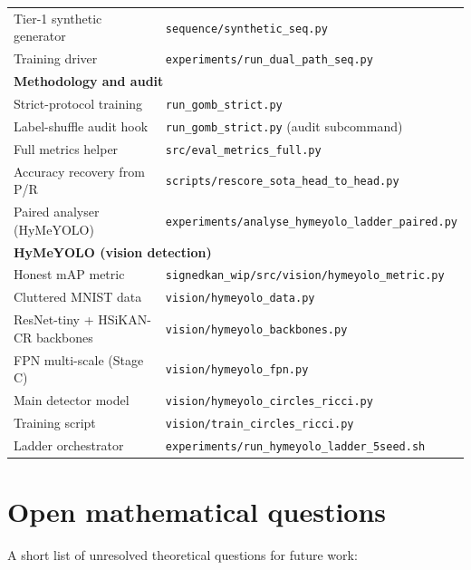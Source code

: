 \documentclass[11pt,a4paper]{article}
\theoremstyle{remark}
\begin{document}
\begin{center}
\begin{tabular}{p{6cm}p{8cm}}
Tier-1 synthetic generator & \texttt{sequence/synthetic\_seq.py} \\
Training driver & \texttt{experiments/run\_dual\_path\_seq.py} \\
\midrule
\multicolumn{2}{l}{\textbf{Methodology and audit}} \\
Strict-protocol training & \texttt{run\_gomb\_strict.py} \\
Label-shuffle audit hook & \texttt{run\_gomb\_strict.py} (audit subcommand) \\
Full metrics helper & \texttt{src/eval\_metrics\_full.py} \\
Accuracy recovery from P/R & \texttt{scripts/rescore\_sota\_head\_to\_head.py} \\
Paired analyser (HyMeYOLO) & \texttt{experiments/analyse\_hymeyolo\_ladder\_paired.py} \\
\midrule
\multicolumn{2}{l}{\textbf{HyMeYOLO (vision detection)}} \\
Honest mAP metric & \texttt{signedkan\_wip/src/vision/hymeyolo\_metric.py} \\
Cluttered MNIST data & \texttt{vision/hymeyolo\_data.py} \\
ResNet-tiny + HSiKAN-CR backbones & \texttt{vision/hymeyolo\_backbones.py} \\
FPN multi-scale (Stage C) & \texttt{vision/hymeyolo\_fpn.py} \\
Main detector model & \texttt{vision/hymeyolo\_circles\_ricci.py} \\
Training script & \texttt{vision/train\_circles\_ricci.py} \\
Ladder orchestrator & \texttt{experiments/run\_hymeyolo\_ladder\_5seed.sh} \\
\bottomrule
\end{tabular}
\end{center}

\section{Open mathematical questions}

A short list of unresolved theoretical questions for future work:
\end{document}
